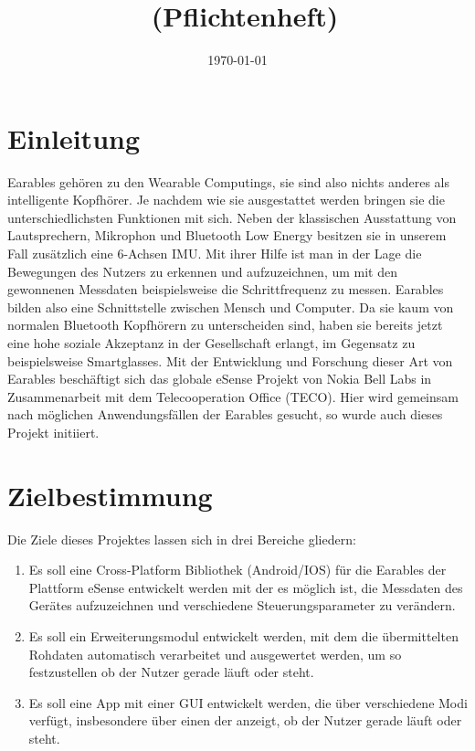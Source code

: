 \documentclass[a4paper,12pt]{article}
\title{\projektName~(Pflichtenheft)}
\author{\authorName}
\date{\today}
\begin{document}
 \setcounter{page}{2}
 \tableofcontents          %
 \clearpage

\section{Einleitung}
\Gls{Earables} gehören zu den \Gls{Wearable Computings}, sie sind also nichts anderes als intelligente Kopfhörer. Je nachdem wie sie ausgestattet werden bringen sie die unterschiedlichsten Funktionen mit sich. Neben der klassischen Ausstattung von Lautsprechern, Mikrophon und Bluetooth Low Energy besitzen sie in unserem Fall zusätzlich eine \Gls{6-Achsen IMU}. Mit ihrer Hilfe ist man in der Lage die Bewegungen des Nutzers zu erkennen und aufzuzeichnen, um mit den gewonnenen Messdaten  beispielsweise die Schrittfrequenz zu messen.  \Gls{Earables} bilden also eine Schnittstelle zwischen Mensch und Computer. Da sie kaum von normalen Bluetooth Kopfhörern zu unterscheiden sind, haben sie bereits jetzt eine hohe soziale Akzeptanz in der Gesellschaft erlangt, im Gegensatz zu beispielsweise Smartglasses. Mit der Entwicklung und Forschung dieser Art von \Gls{Earables} beschäftigt sich das globale eSense Projekt von Nokia Bell Labs in Zusammenarbeit mit dem Telecooperation Office (TECO). Hier wird gemeinsam nach möglichen Anwendungsfällen der \Gls{Earables} gesucht, so wurde auch dieses Projekt initiiert.
\section{Zielbestimmung}
Die Ziele dieses Projektes lassen sich in drei Bereiche gliedern:
\begin{enumerate}

  \item Es soll eine \Gls{Cross-Platform Bibliothek} (Android/IOS) für die \Gls{Earables} der Plattform eSense entwickelt werden mit der es möglich ist, die Messdaten des Gerätes aufzuzeichnen und verschiedene \Gls{Steuerungsparameter} zu verändern.
  
  \item Es soll ein Erweiterungsmodul entwickelt werden, mit dem die übermittelten  \Gls{Rohdaten} automatisch verarbeitet und ausgewertet werden, um so festzustellen ob der Nutzer gerade läuft oder steht.
  
  \item Es soll eine App mit einer \Gls{GUI} entwickelt werden, die über verschiedene Modi verfügt, insbesondere über einen der anzeigt, ob der Nutzer gerade läuft oder steht. 

\end{enumerate}
\end{document}
